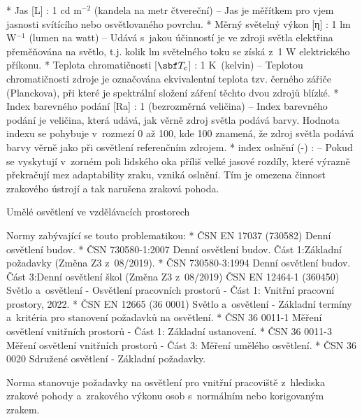 \begitems
* {\sbf Jas [L]} : 1 cd m$^{-2}$ (kandela na metr čtvereční)
    -- Jas je měřítkem pro vjem jasnosti svítícího nebo osvětlovaného povrchu.
* {\sbf Měrný světelný výkon [η]} : 1 lm W$^{-1}$ (lumen na watt) --
    Udává s~jakou účinností je ve zdroji světla elektřina přeměňována na světlo, t.j. kolik
    lm světelného toku se získá z~1 W elektrického příkonu.
* {\sbf Teplota chromatičnosti [$\sbf T_c$]} : 1 K~(kelvin) -- Teplotou chromatičnosti zdroje je označována ekvivalentní
    teplota tzv. černého zářiče (Planckova), při které je spektrální složení záření těchto dvou zdrojů blízké.
* {\sbf Index barevného podání [Ra]} : 1 (bezrozměrná veličina) --
    Index barevného podání je veličina, která udává, jak věrně zdroj světla podává barvy.
    Hodnota indexu se pohybuje v~rozmezí 0 až 100, kde 100 znamená, že zdroj světla podává barvy věrně
    jako při osvětlení referenčním zdrojem.
* {\sbf index oslnění  (-)} : -- Pokud se vyskytují v~zorném poli lidského oka příliš velké
    jasové rozdíly, které výrazně překračují mez adaptability zraku, vzniká oslnění.
    Tím je omezena činnost zrakového ústrojí a tak narušena zraková pohoda.
\enditems

\sec Umělé osvětlení ve vzdělávacích prostorech

Normy zabývající se touto problematikou:
\begitems
* ČSN EN 17037 (730582) Denní osvětlení budov.
* ČSN 730580-1:2007 Denní osvětlení budov. Část 1:Základní požadavky (Změna Z3 z~08/2019).
* ČSN 730580-3:1994 Denní osvětlení budov. Část 3:Denní osvětlení škol (Změna Z3 z~08/2019)
ČSN EN 12464-1 (360450) Světlo a~osvětlení - Osvětlení pracovních prostorů - Část 1: Vnitřní pracovní prostory, 2022.
* ČSN EN 12665 (36 0001) Světlo a~osvětlení - Základní termíny a~kritéria pro stanovení požadavků na osvětlení.
* ČSN 36 0011-1 Měření osvětlení vnitřních prostorů - Část 1: Základní ustanovení.
* ČSN 36 0011-3 Měření osvětlení vnitřních prostorů - Část 3: Měření umělého osvětlení.
* ČSN 36 0020 Sdružené osvětlení - Základní požadavky.
\enditems

\noindent

Norma stanovuje požadavky na osvětlení pro vnitřní pracoviště z~hlediska zrakové pohody a~zrakového výkonu osob s~normálním nebo korigovaným zrakem.


